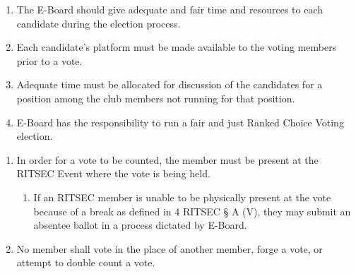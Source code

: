 


\begin{enumerate}
	\item The E-Board should give adequate and fair time and resources to each candidate
	      during the election process.
	\item Each candidate's platform must be made available to the voting members prior to
	      a vote.
	\item Adequate time must be allocated for discussion of the candidates for a position
	      among the club members not running for that position.
	\item E-Board has the responsibility to run a fair and just Ranked Choice Voting
	      election.
\end{enumerate}


\begin{enumerate}
	\item In order for a vote to be counted, the member must be present at the RITSEC
	      Event where the vote is being held.
	      \begin{enumerate}
		      \item If an RITSEC member is unable to be physically present at the vote because of a
		            break as defined in 4 RITSEC § A (V), they may submit an absentee ballot in a
		            process dictated by E-Board.
	      \end{enumerate}
	\item No member shall vote in the place of another member, forge a vote, or attempt
	      to double count a vote.
\end{enumerate}


